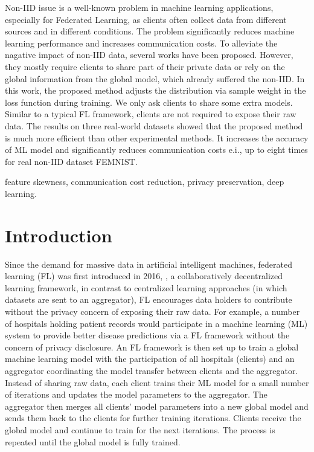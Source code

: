 \documentclass[journal]{IEEEtai}
\begin{document}
\begin{IEEEImpStatement}
	Non-IID issue is a well-known problem in machine learning applications, especially for Federated Learning, as clients often collect data from different sources and in different conditions. The problem significantly reduces machine learning performance and increases communication costs. To alleviate the nagative impact of non-IID data, several works have been proposed. However, they mostly require clients to share part of their private data or rely on the global information from the global model, which already suffered the non-IID. In this work, the proposed method adjusts the distribution via sample weight in the loss function during training. We only ask clients to share some extra models. Similar to a typical FL framework, clients are not required to expose their raw data. The results on three real-world datasets showed that the proposed method is much more efficient than other experimental methods. It increases the accuracy of ML model and significantly reduces communication costs e.i., up to eight times for real non-IID dataset FEMNIST.     
\end{IEEEImpStatement}	
	
\begin{IEEEkeywords}
feature skewness, communication cost reduction, privacy preservation, deep learning.
\end{IEEEkeywords}

\IEEEpeerreviewmaketitle


\section{Introduction}

Since the demand for massive data in artificial intelligent machines, federated learning (FL) was first introduced in 2016, \cite{OriginFL}, a collaboratively decentralized learning framework, in contrast to centralized learning approaches (in which datasets are sent to an aggregator), FL encourages data holders to contribute without the privacy concern of exposing their raw data. For example, a number of hospitals holding patient records would participate in a machine learning (ML) system to provide better disease predictions via a FL framework without the concern of privacy disclosure. An FL framework is then set up to train a global machine learning model with the participation of all hospitals (clients) and an aggregator coordinating the model transfer between clients and the aggregator. Instead of sharing raw data, each client trains their ML model for a small number of iterations and updates the model parameters to the aggregator. The aggregator then merges all clients' model parameters into a new global model and sends them back to the clients for further training iterations. Clients receive the global model and continue to train for the next iterations. The process is repeated until the global model is fully trained.    
\end{document}
